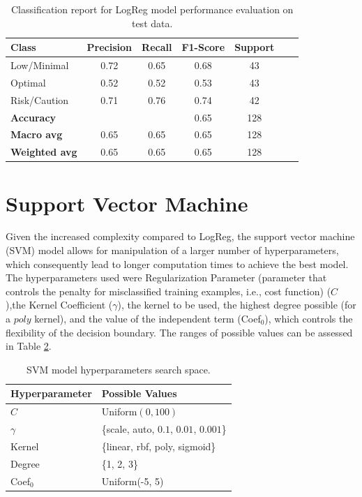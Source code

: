 \documentclass[conference]{IEEEtran}
\begin{document}
\begin{table}[H]
\centering
\caption{Classification report for LogReg model performance evaluation on test data.}
\label{crTestLogREg}
\begin{tabular}{lcccccc}
\toprule
\textbf{Class} & \textbf{Precision} & \textbf{Recall} & \textbf{F1-Score} & \textbf{Support} \\
\midrule
Low/Minimal & 0.72 & 0.65 & 0.68 & 43 \\
Optimal & 0.52 & 0.52 & 0.53 & 43 \\
Risk/Caution & 0.71 & 0.76 & 0.74 & 42 \\
\midrule
\textbf{Accuracy} &  &  & 0.65 & 128 \\
\textbf{Macro avg} & 0.65 & 0.65 & 0.65 & 128 \\
\textbf{Weighted avg} & 0.65 & 0.65 & 0.65 & 128 \\
\bottomrule
\end{tabular}
\end{table}



\section{Support Vector Machine}

Given the increased complexity compared to LogReg, the support vector machine (SVM) model allows for manipulation of a larger number of hyperparameters, which consequently lead to longer computation times to achieve the best model. The hyperparameters used were Regularization Parameter (parameter that controls the penalty for misclassified training examples, i.e., cost function) ($C$),the Kernel Coefficient ($\gamma$), the kernel to be used, the highest degree possible (for a $poly$ kernel), and the value of the independent term (Coef$_0$), which controls the flexibility of the decision boundary. The ranges of possible values can be assessed in Table \ref{parametrosSVM}.

\begin{table}[H]
\centering
\caption{SVM model hyperparameters search space.}
\label{parametrosSVM}
\begin{tabular}{ll}
\toprule
\textbf{Hyperparameter} & \textbf{Possible Values} \\
\midrule
$C$ & Uniform$(0, 100)$ \\ 
$\gamma$ & \{scale, auto, $0.1$, $0.01$, $0.001$\} \\ 
Kernel & \{linear, rbf, poly, sigmoid\} \\ 
Degree & \{1, 2, 3\} \\ 
Coef$_0$ & Uniform(-5, 5) \\
\bottomrule
\end{tabular}
\end{table}
\end{document}
